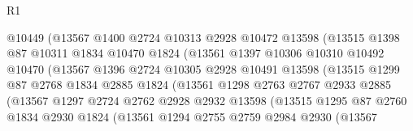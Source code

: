 \begin{lexlean}{R1}
\begin{coremodule}
                          @10449
                          (@13567
                            @1400
                            @2724
                            @10313
                            @2928
                            @10472
                            @13598
                            (@13515
                              @1398
                              @87
                              @10311
                              @1834
                              @10470
                              @1824
                              (@13561
                                @1397
                                @10306
                                @10310
                                @10492
                                @10470
                                (@13567
                                  @1396
                                  @2724
                                  @10305
                                  @2928
                                  @10491
                                  @13598
                                  (@13515
                                    @1299
                                    @87
                                    @2768
                                    @1834
                                    @2885
                                    @1824
                                    (@13561
                                      @1298
                                      @2763
                                      @2767
                                      @2933
                                      @2885
                                      (@13567
                                        @1297
                                        @2724
                                        @2762
                                        @2928
                                        @2932
                                        @13598
                                        (@13515
                                          @1295
                                          @87
                                          @2760
                                          @1834
                                          @2930
                                          @1824
                                          (@13561
                                            @1294
                                            @2755
                                            @2759
                                            @2984
                                            @2930
                                            (@13567

\end{coremodule}
\end{lexlean}

